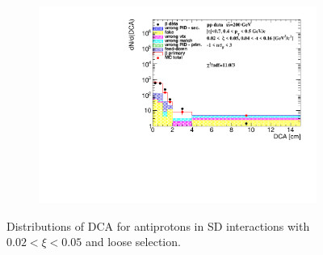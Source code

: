 \begin{figure}[h!]
\begin{subfigure}{.45\textwidth}
		\includegraphics[width=\linewidth, page=14]{chapters/chrgSTAR/img/DCAproton/background_p_bar_0.pdf}
	\end{subfigure}
	\caption{Distributions of DCA for antiprotons in SD interactions with $0.02 < \xi<0.05$ and loose selection.}
	\label{fig:dca_proton_bar_0}
\end{figure}
